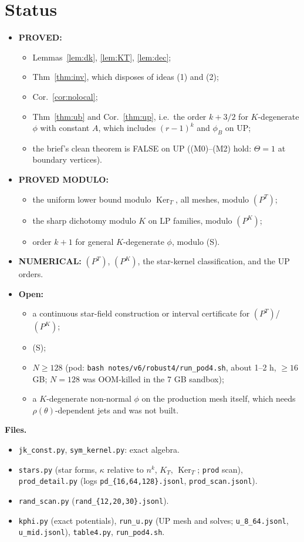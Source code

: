 \documentclass[11pt]{article}
\theoremstyle{remark}
\begin{document}
\section{Status}
\begin{itemize}
\item \textbf{PROVED:}
 \begin{itemize}
 \item Lemmas~\ref{lem:dk}, \ref{lem:KT}, \ref{lem:dec};
 \item Thm~\ref{thm:inv}, which disposes of ideas (1) and (2);
 \item Cor.~\ref{cor:nolocal};
 \item Thm~\ref{thm:ub} and Cor.~\ref{thm:up}, i.e.\ the order $k+3/2$ for $K$-degenerate $\phi$ with constant $A$, which
 includes $(r-1)^k$ and $\phi_B$ on \textsf{UP};
 \item the brief's clean theorem is FALSE on \textsf{UP} ((M0)--(M2) hold: $\Theta=1$ at boundary vertices).
 \end{itemize}
\item \textbf{PROVED MODULO:}
 \begin{itemize}
 \item the uniform lower bound modulo $\operatorname{Ker}_T$, all meshes, modulo $(P^T)$;
 \item the sharp dichotomy modulo $K$ on LP families, modulo $(P^K)$;
 \item order $k+1$ for general $K$-degenerate $\phi$, modulo (S).
 \end{itemize}
\item \textbf{NUMERICAL:} $(P^T)$, $(P^K)$, the star-kernel classification, and the \textsf{UP} orders.
\item \textbf{Open:}
 \begin{itemize}
 \item a continuous star-field construction or interval certificate for $(P^T)$/$(P^K)$;
 \item (S);
 \item $N\ge128$ (pod: \texttt{bash notes/v6/robust4/run\_pod4.sh}, about 1--2 h, $\ge16$ GB; $N=128$ was OOM-killed in the 7 GB sandbox);
 \item a $K$-degenerate non-normal $\phi$ on the production mesh itself, which needs $\rho(\theta)$-dependent jets and was not
 built.
 \end{itemize}
\end{itemize}
\noindent\textbf{Files.}
\begin{itemize}
\item \texttt{jk\_const.py}, \texttt{sym\_kernel.py}: exact algebra.
\item \texttt{stars.py} (star forms, $\kappa$ relative to $n^k$, $K_T$, $\operatorname{Ker}_T$; \texttt{prod} scan),
\texttt{prod\_detail.py} (logs \texttt{pd\_\{16,64,128\}.jsonl}, \texttt{prod\_scan.jsonl}).
\item \texttt{rand\_scan.py} (\texttt{rand\_\{12,20,30\}.jsonl}).
\item \texttt{kphi.py} (exact potentials), \texttt{run\_u.py} (\textsf{UP} mesh and solves; \texttt{u\_8\_64.jsonl},
\texttt{u\_mid.jsonl}), \texttt{table4.py}, \texttt{run\_pod4.sh}.
\end{itemize}
\end{document}
